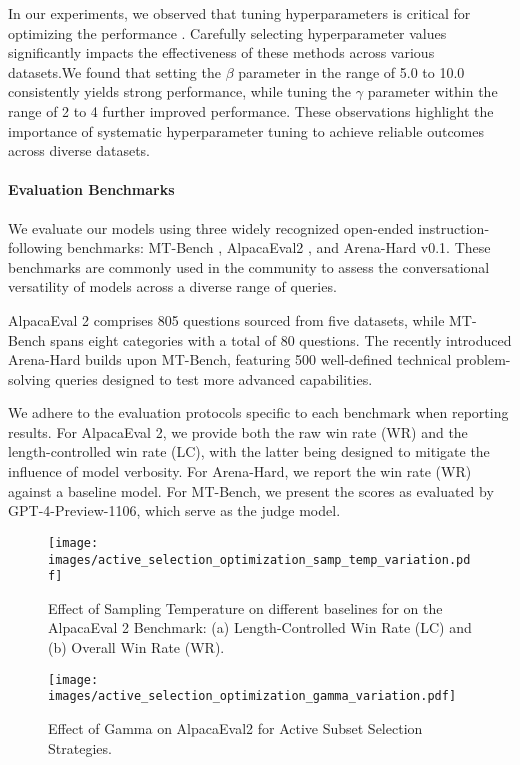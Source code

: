 In our experiments, we observed that tuning hyperparameters is critical for optimizing the performance . Carefully selecting hyperparameter values significantly impacts the effectiveness of these methods across various datasets.We found that setting the $\beta$ parameter in the range of 5.0 to 10.0 consistently yields strong performance, while tuning the $\gamma$ parameter within the range of 2 to 4 further improved performance. These observations highlight the importance of systematic hyperparameter tuning to achieve reliable outcomes across diverse datasets.

\paragraph{Evaluation Benchmarks}
We evaluate our models using three widely recognized open-ended instruction-following benchmarks: MT-Bench \cite{zheng2023judging}, AlpacaEval2 \cite{dubois2024length}, and Arena-Hard v0.1. These benchmarks are commonly used in the community to assess the conversational versatility of models across a diverse range of queries.

AlpacaEval 2 comprises 805 questions sourced from five datasets, while MT-Bench spans eight categories with a total of 80 questions. The recently introduced Arena-Hard builds upon MT-Bench, featuring 500 well-defined technical problem-solving queries designed to test more advanced capabilities.

We adhere to the evaluation protocols specific to each benchmark when reporting results. For AlpacaEval 2, we provide both the raw win rate (WR) and the length-controlled win rate (LC), with the latter being designed to mitigate the influence of model verbosity. For Arena-Hard, we report the win rate (WR) against a baseline model. For MT-Bench, we present the scores as evaluated by GPT-4-Preview-1106, which serve as the judge model.


\begin{figure}[!b]
    \centering
\texttt{[image: images/active\_selection\_optimization\_samp\_temp\_variation.pdf]}
    \vspace{-0.25in}
    \caption{Effect of Sampling Temperature on different baselines for on the AlpacaEval 2 Benchmark: (a) Length-Controlled Win Rate (LC) and (b) Overall Win Rate (WR).}
    \label{fig:samp-temp-analysis}
\end{figure}

\begin{figure}[!b]
    \centering
\texttt{[image: images/active\_selection\_optimization\_gamma\_variation.pdf]}
    \vspace{-0.15in}
    \caption{Effect of Gamma on AlpacaEval2 for Active Subset Selection Strategies.}
    \label{fig:samp-gamma-analysis}
\end{figure}

